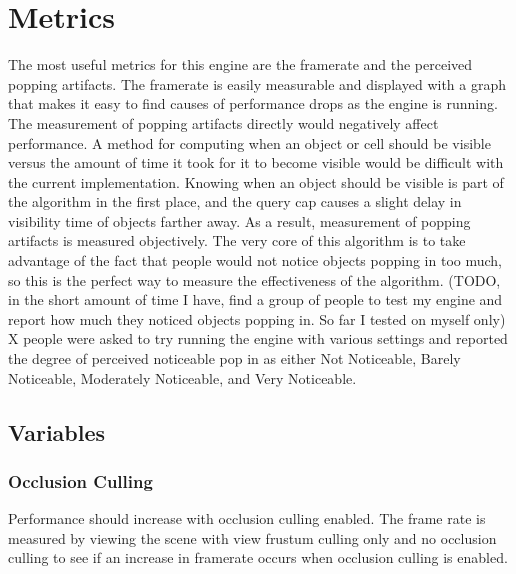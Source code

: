 \documentclass[12pt]{ucthesis}
\newcommand{\captionfonts}{\small\bf\ssp}
\begin{document}
\section {Metrics}
\label{metrics}

The most useful metrics for this engine are the framerate and the perceived popping artifacts.
The framerate is easily measurable and displayed with a graph that makes it easy to find causes of performance drops as the engine is running.
The measurement of popping artifacts directly would negatively affect performance.
A method for computing when an object or cell should be visible versus the amount of time it took for it to become visible would be difficult with the current implementation.
Knowing when an object should be visible is part of the algorithm in the first place, and the query cap causes a slight delay in visibility time of objects farther away.
As a result, measurement of popping artifacts is measured objectively.
The very core of this algorithm is to take advantage of the fact that people would not notice objects popping in too much, so this is the perfect way to measure the effectiveness of the algorithm.
(TODO, in the short amount of time I have, find a group of people to test my engine and report how much they noticed objects popping in.  So far I tested on myself only)
X people were asked to try running the engine with various settings and reported the degree of perceived noticeable pop in as either Not Noticeable, Barely Noticeable, Moderately Noticeable, and Very Noticeable.


\subsection {Variables}
\label{variables}

\subsubsection{Occlusion Culling}
\label{vars-occlusion-culling}
Performance should increase with occlusion culling enabled.
The frame rate is measured by viewing the scene with view frustum culling only and no occlusion culling to see if an increase in framerate occurs when occlusion culling is enabled.
\end{document}
